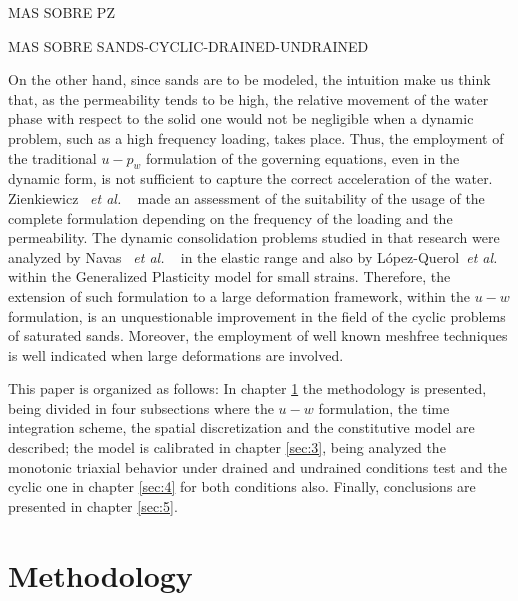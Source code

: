 \documentclass[preprint,12pt,a4paper]{elsarticle}
\begin{document}
MAS SOBRE PZ

MAS SOBRE SANDS-CYCLIC-DRAINED-UNDRAINED

On the other hand, since sands are to be modeled, the intuition make us think that, as the permeability tends to be high, the relative movement of the water phase with respect to the solid one would not be negligible when a dynamic problem, such as a high frequency loading, takes place. Thus, the employment of the traditional $u-p_w$ formulation of the governing equations, even in the dynamic form, is not sufficient to capture the correct acceleration of the water. Zienkiewicz ~\textit{et al.} ~\cite{zienkiewicz1980} made an assessment of the suitability of the usage of the complete formulation depending on the frequency of the loading and the permeability. The dynamic consolidation problems studied in that research were analyzed by Navas ~\textit{et al.} ~\cite{Navas2016b} in the elastic range and also by L\'opez-Querol~\textit{et al.} ~\cite{LopezQuerol2006} within the Generalized Plasticity model for small strains. Therefore, the extension of such formulation to a large deformation framework, within the $u-w$ formulation, is an unquestionable improvement in the field of the cyclic problems of saturated sands. Moreover, the employment of well known meshfree techniques is well indicated when large deformations are involved.

This paper is organized as follows:  In chapter \ref{sec:2} the methodology is presented, being divided in four subsections where the $u-w$ formulation, the time integration scheme, the spatial discretization and the constitutive model are described; the model is calibrated in chapter \ref{sec:3}, being analyzed the monotonic triaxial behavior under drained and undrained conditions test and the cyclic one in chapter \ref{sec:4} for both conditions also. Finally, conclusions are presented in chapter \ref{sec:5}.

\section{Methodology}\label{sec:2}
\end{document}
